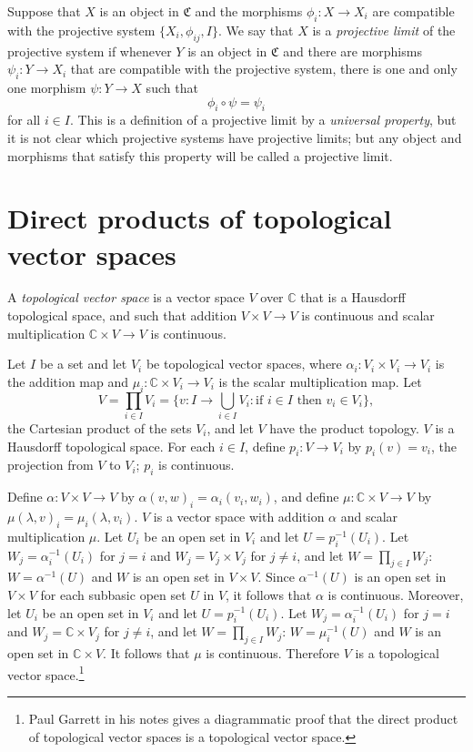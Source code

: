 \documentclass{article}
\begin{document}
Suppose that $X$ is an object in $\mathfrak{C}$ and the morphisms $\phi_i:X \to X_i$ are compatible with the projective system $\{X_i,\phi_{ij},I\}$.
We say that $X$ is a 
{\em projective limit} of the projective system if whenever $Y$ is an object in $\mathfrak{C}$ and there are morphisms
 $\psi_i:Y \to X_i$ that are compatible with the projective
system, there is one and only one morphism
$\psi:Y \to X$ such that
\[
\phi_i \circ \psi = \psi_i
\]
for all $i \in I$. This is a definition of a projective limit by a {\em universal 
property}, but it is not clear which projective systems have projective limits; but any object and morphisms that satisfy this property will be called
a projective limit.

\section{Direct products of topological vector spaces}
A {\em topological vector space} is a vector space $V$ over $\mathbb{C}$ that is a Hausdorff topological space, and such that addition
$V \times V \to V$ is continuous and scalar multiplication $\mathbb{C} \times V \to V$ is continuous.

Let $I$ be a set and let $V_i$ be topological vector spaces, where $\alpha_i:V_i \times V_i \to V_i$ is the addition map and
$\mu_i:\mathbb{C} \times V_i \to V_i$ is the scalar multiplication map. Let
\[
V=\prod_{i \in I} V_i = \Big\{v:I \to \bigcup_{i \in I} V_i : \textrm{if $i \in I$ then $v_i \in V_i$} \Big\},
\]
the Cartesian product
of the sets $V_i$, and let $V$ have the product topology. $V$ is a Hausdorff topological space. 
For each $i \in I$, define
$p_i:V \to V_i$ 
by $p_i(v)=v_i$, the projection from $V$ to $V_i$; 
$p_i$ is continuous. 

Define $\alpha:V \times V \to V$ by $\alpha(v,w)_i=\alpha_i(v_i,w_i)$, and define $\mu:\mathbb{C} \times V \to V$ by
$\mu(\lambda,v)_i=\mu_i(\lambda, v_i)$. $V$ is a vector space with addition $\alpha$ and scalar multiplication $\mu$. 
Let $U_i$ be an open set in $V_i$ and let  $U=p_i^{-1}(U_i)$.
Let $W_j=\alpha_i^{-1}(U_i)$ for $j=i$ and $W_j=V_j \times V_j$ for $j \neq i$, and let
$W=\prod_{j \in I} W_j$: $W=\alpha^{-1}(U)$ and $W$ is an open set in $V \times V$. Since $\alpha^{-1}(U)$ is an open set in 
$V \times V$ for each subbasic open set $U$ in $V$, it follows that $\alpha$ is continuous. 
Moreover, let $U_i$ be an open set in $V_i$  and let  $U=p_i^{-1}(U_i)$.
Let $W_j=\alpha_i^{-1}(U_i)$ for $j=i$ and $W_j=\mathbb{C} \times V_j$ for $j \neq i$, and let $W=\prod_{j \in I} W_j$:
$W=\mu_i^{-1}(U)$ and $W$ is an open set in $\mathbb{C} \times V$. It follows that $\mu$ is continuous.
Therefore $V$ is a topological vector space.\footnote{Paul Garrett in his notes gives a diagrammatic proof that
the direct product of topological vector spaces is a topological vector space.}
\end{document}
